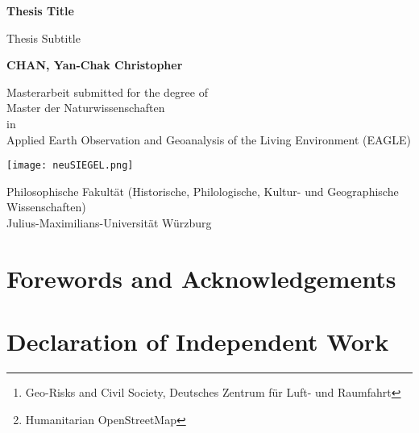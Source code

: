 \documentclass[11pt, a4paper, twoside]{report}
\begin{document}
\begin{titlepage}
   \begin{center}
       \vspace*{1cm}

       \huge
       \textbf{Thesis Title}

       \vspace{0.5cm}
       \Large
       Thesis Subtitle

       \vspace{1.5cm}

       \textbf{CHAN, Yan-Chak Christopher}

       \vfill

       Masterarbeit submitted for the degree of\\
       Master der Naturwissenschaften\\
       in\\
       Applied Earth Observation and Geoanalysis of the Living Environment (EAGLE)

       \vspace{0.8cm}

       \texttt{[image: neuSIEGEL.png]}

       \normalsize
       Philosophische Fakultät (Historische, Philologische, Kultur- und Geographische Wissenschaften)\\
       Julius-Maximilians-Universität Würzburg\\

       \author{Supervised by: \\
       Prof. Dr. Hannes Taubenöck \thanks{Geo-Risks and Civil Society, Deutsches Zentrum für Luft- und Raumfahrt} \\
       Emran Alchikh Alnajar \thanks{Humanitarian OpenStreetMap}
       }
       \date{\today}

   \end{center}
\end{titlepage}

\newpage

\section{Forewords and Acknowledgements}
\pagestyle{empty}

\newpage

\section{Declaration of Independent Work}
\pagestyle{empty}
\end{document}

